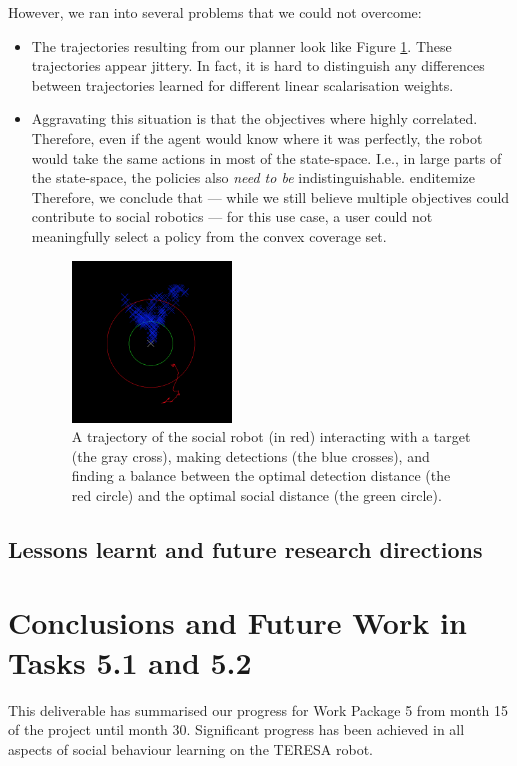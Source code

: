 \documentclass[a4paper,11pt]{report}
\begin{document}
However, we ran into several problems that we could not overcome: 
\begin{itemize}
\item The trajectories resulting from our planner look like Figure \ref{fig:motraj}. These trajectories appear jittery. In fact, it is hard to distinguish any differences between trajectories learned for different linear scalarisation weights. 
\item Aggravating this situation is that the objectives where highly correlated. Therefore, even if the agent would know where it was perfectly, the robot would take the same actions in most of the state-space. I.e., in large parts of the state-space, the policies also \emph{need to be} indistinguishable. 
end{itemize}
Therefore, we conclude that --- while we still believe multiple objectives could contribute to social robotics --- for this use case, a user could not meaningfully select a policy from the convex coverage set. 
\begin{figure}
\centering
\includegraphics[width=0.4\textwidth]{motrajectory.png}
\caption[Robot interaction trajectory]{A trajectory of the social robot (in red) interacting with a target (the gray 
cross), making detections (the blue crosses), and finding a balance between the optimal 
detection distance (the red circle) and the optimal social distance (the green circle).}
\label{fig:motraj}
\end{figure}
\end{itemize}
\subsection{Lessons learnt and future research directions}


\section{Conclusions and Future Work in Tasks 5.1 and 5.2}
\label{sec:conclusions}
This deliverable has summarised our progress for Work Package 5 from month 15 of the project until month 30. Significant progress has been achieved in all aspects of social behaviour learning on the TERESA robot. 
\end{document}
